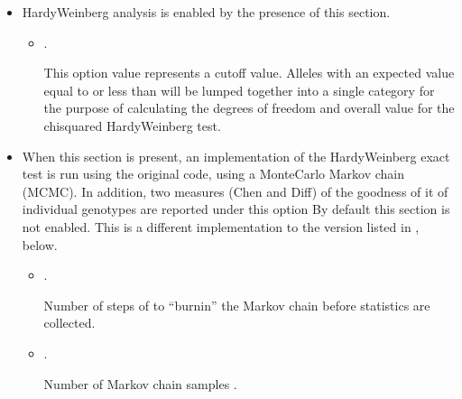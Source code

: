 \documentclass[letterpaper,10pt,english,openany,oneside]{sphinxmanual}
\begin{document}
\begin{itemize}
\item {} 
\sphinxAtStartPar
\sphinxcode{\sphinxupquote{{[}HardyWeinberg{]}}}

\sphinxAtStartPar
Hardy\sphinxhyphen{}Weinberg analysis is enabled by the presence of this section.
\begin{itemize}
\item {} 
\sphinxAtStartPar
{}.

\sphinxAtStartPar
This option value represents a cut\sphinxhyphen{}off value. Alleles with an
expected value equal to or less than  will be lumped
together into a single category for the purpose of calculating the
degrees of freedom and overall \sphinxhyphen{}value for the chi\sphinxhyphen{}squared
Hardy\sphinxhyphen{}Weinberg test.

\end{itemize}

\item {} 
\sphinxAtStartPar
\sphinxcode{\sphinxupquote{{[}HardyWeinbergGuoThompson{]}}}

\sphinxAtStartPar
When this section is present, an implementation of the
Hardy\sphinxhyphen{}Weinberg exact test is run using the original
 code, using a Monte\sphinxhyphen{}Carlo Markov chain (MCMC). In
addition, two measures (Chen and Diff) of the goodness of it of
individual genotypes are reported under this option 
By default this section is not enabled. This is a different
implementation to the  version listed in
{\hyperref[\detokenize{docs/guide-chapter-usage:config-advanced}]{}}, below.
\begin{itemize}
\item {} 
\sphinxAtStartPar
{}.

\sphinxAtStartPar
Number of steps of to “burn\sphinxhyphen{}in” the Markov chain before statistics
are collected.\sphinxstylestrong{{[}Default:}  \sphinxstylestrong{{]}}

\item {} 
\sphinxAtStartPar
{}.

\sphinxAtStartPar
Number of Markov chain samples \sphinxstylestrong{{[}Default:}  \sphinxstylestrong{{]}}.


\end{itemize}
\end{itemize}
\end{document}
